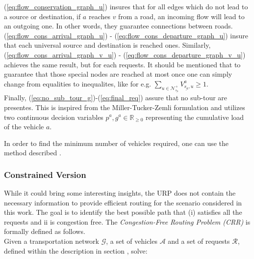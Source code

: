 (\ref{eq:flow_conservation_graph_u}) insures that for all edges which do not lead to a source or destination, if $a$ reaches $v$ from a road, an incoming flow will lead to an outgoing one. In other words, they guarantee connections between roads. (\ref{eq:flow_cons_arrival_graph_u}) -  (\ref{eq:flow_cons_departure_graph_u}) insure that each universal source and destination is reached ones. Similarly, (\ref{eq:flow_cons_arrival_graph_v_u}) -  (\ref{eq:flow_cons_departure_graph_v_u}) achieves the same result, but for each requests.  It should be mentioned that to guarantee that those special nodes are reached at most once one can simply change from equalities to inequalites, like for e.g. $\sum_{ u \in \mathcal{N}^+_{\underline{s_a}} }V^a_{ \underline{s_a},u} \ge 1$.\\
Finally, (\ref{eq:no_sub_tour_g})-(\ref{eq:final_req}) assure that no sub-tour are presentes. This is inspired from the Miller-Tucker-Zemli formulation and utilizes two continuous decision variables $p^a, g^a \in \mathbb{R}_{\ge0}$ representing the cumulative load of the vehicle $a$. 

In order to find the minimum number of vehicles required, one can use the method described . 
\subsubsection*{Constrained Version}
While it could bring some interesting insights, the URP does not contain the necessary information to provide efficient routing for the scenario considered in this work. The goal is to identify the best possible path that \textup{(i)} satisfies all the requests and \textup{ii} is congestion free. The \textit{Congestion-Free Routing Problem (CRR)} is formally defined as follows.\\ Given a transportation network $\mathcal{G}$, a set of vehicles $\mathcal{A}$ and a set of requests $\mathcal{R}$, defined within the description in section , solve:

